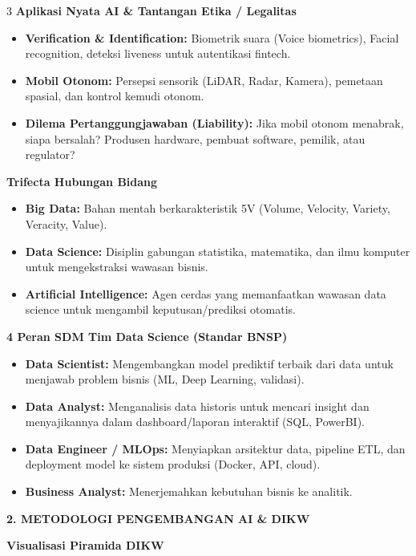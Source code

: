 \documentclass[6.8pt,landscape,a4paper]{extarticle}
\newcommand{\sdtSection}[2][sdtNavy]{%
    \vspace{0.6pt}%
    \noindent\colorbox{#1}{%
        \parbox{\dimexpr\linewidth-2\fboxsep\relax}{%
            \textbf{\fontsize{6.5pt}{7.5pt}\selectfont\color{white}#2}%
        }%
    }\vspace{0.3pt}%
}
\newcommand{\sdtSub}[1]{%
    \vspace{0.5pt}%
    \noindent\textbf{\fontsize{5.8pt}{6.8pt}\selectfont\color{sdtBlue}#1}\vspace{0.1pt}%
}
\begin{document}
\begin{multicols}{3}
\sdtSub{Aplikasi Nyata AI \& Tantangan Etika / Legalitas}
\begin{itemize}
    \item \textbf{Verification \& Identification:} Biometrik suara (Voice biometrics), Facial recognition, deteksi liveness untuk autentikasi fintech.
    \item \textbf{Mobil Otonom:} Persepsi sensorik (LiDAR, Radar, Kamera), pemetaan spasial, dan kontrol kemudi otonom.
    \item \textbf{Dilema Pertanggungjawaban (Liability):} Jika mobil otonom menabrak, siapa bersalah? Produsen hardware, pembuat software, pemilik, atau regulator?
\end{itemize}

\sdtSub{Trifecta Hubungan Bidang}
\begin{itemize}
    \item \textbf{Big Data:} Bahan mentah berkarakteristik 5V (Volume, Velocity, Variety, Veracity, Value).
    \item \textbf{Data Science:} Disiplin gabungan statistika, matematika, dan ilmu komputer untuk mengekstraksi wawasan bisnis.
    \item \textbf{Artificial Intelligence:} Agen cerdas yang memanfaatkan wawasan data science untuk mengambil keputusan/prediksi otomatis.
\end{itemize}

\sdtSub{4 Peran SDM Tim Data Science (Standar BNSP)}
\begin{itemize}
    \item \textbf{Data Scientist:} Mengembangkan model prediktif terbaik dari data untuk menjawab problem bisnis (ML, Deep Learning, validasi).
    \item \textbf{Data Analyst:} Menganalisis data historis untuk mencari insight dan menyajikannya dalam dashboard/laporan interaktif (SQL, PowerBI).
    \item \textbf{Data Engineer / MLOps:} Menyiapkan arsitektur data, pipeline ETL, dan deployment model ke sistem produksi (Docker, API, cloud).
    \item \textbf{Business Analyst:} Menerjemahkan kebutuhan bisnis ke analitik.
\end{itemize}



\sdtSection{2. METODOLOGI PENGEMBANGAN AI \& DIKW}

\sdtSub{Visualisasi Piramida DIKW}
\begin{center}
\end{center}
\end{multicols}
\end{document}
